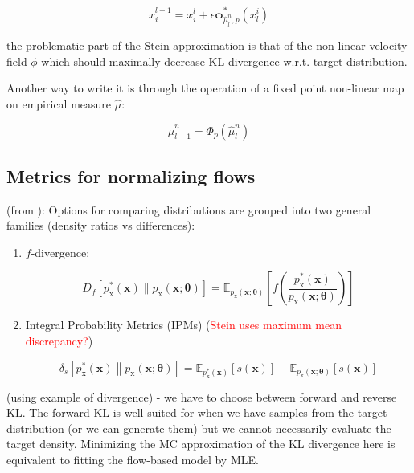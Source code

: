 \documentclass[12pt]{article}
\renewcommand{\[}{\left[}
\renewcommand{\]}{\right]}
\renewcommand{\(}{\left(}
\renewcommand{\)}{\right)}
\begin{document}

\begin{equation*}
    x_i^{l+1} = x_i^{l} + \epsilon \mathbf{\phi}_{\hat{\mu}_l^n, p}^{\ast}(x_l^i)
\end{equation*}

the problematic part of the Stein approximation is that of the non-linear velocity field $\phi$ which should maximally decrease KL divergence w.r.t. target distribution. 

Another way to write it is through the operation of a fixed point non-linear map on empirical measure $\hat{\mu}$:

$$\hat{\mu}_{l + 1}^n = \Phi_p (\hat{\mu}_l^n)$$




\subsection{Metrics for normalizing flows}

(from \cite{papamakarios_normalizing_2021}):
Options for comparing distributions are grouped into two general families (density ratios vs differences):

\begin{enumerate}
    \item $f$-divergence:

    $$D_f\left[p_\mathrm{x}^*(\mathbf{x})\parallel p_\mathrm{x}(\mathbf{x};\boldsymbol{\theta})\right]=\mathbb{E}_{p_\mathrm{x}(\mathbf{x};\boldsymbol{\theta})}\left[f\left(\frac{p_\mathrm{x}^*(\mathbf{x})}{p_\mathrm{x}(\mathbf{x};\boldsymbol{\theta})}\right)\right]$$

    \item Integral Probability Metrics (IPMs) (\textcolor{red}{Stein uses maximum mean discrepancy?})

    $$\delta_s\left[p_\mathrm{x}^*(\mathbf{x})\left\|p_\mathrm{x}(\mathbf{x};\boldsymbol{\theta})\right.\right]=\mathbb{E}_{p_\mathrm{x}^*(\mathbf{x})}\left[\left.s(\mathbf{x})\right.\right]-\mathbb{E}_{p_\mathrm{x}(\mathbf{x};\boldsymbol{\theta})}\left[\left.s(\mathbf{x})\right.\right]$$
\end{enumerate}

(using example of divergence) - we have to choose between forward and reverse KL. The forward KL is well suited for when we have samples from the target distribution (or we can generate them) but we cannot necessarily evaluate the target density. Minimizing the MC approximation of the KL divergence here is equivalent to fitting the flow-based model by MLE.
\end{document}
